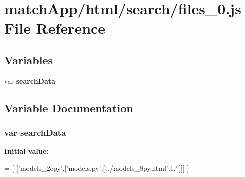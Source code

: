 \section{match\+App/html/search/files\+\_\+0.js File Reference}
\label{files__0_8js}
\subsection*{Variables}
\begin{DoxyCompactItemize}
\item 
var {\bf search\+Data}
\end{DoxyCompactItemize}


\subsection{Variable Documentation}
\subsubsection[{search\+Data}]{\setlength{\rightskip}{0pt plus 5cm}var search\+Data}\label{files__0_8js_ad01a7523f103d6242ef9b0451861231e}
{\bfseries Initial value\+:}
\begin{DoxyCode}
=
[
  [\textcolor{stringliteral}{'models\_2epy'},[\textcolor{stringliteral}{'models.py'},[\textcolor{stringliteral}{'../models\_8py.html'},1,\textcolor{stringliteral}{''}]]]
]
\end{DoxyCode}
